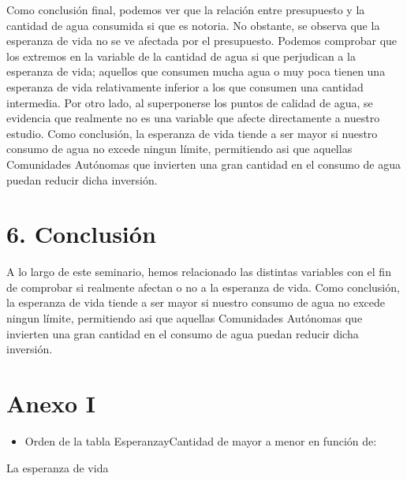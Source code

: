\documentclass[
]{article}
\newenvironment{Shaded}{\begin{snugshade}}{\end{snugshade}}
\newcommand{\FunctionTok}[1]{\textcolor[rgb]{0.13,0.29,0.53}{\textbf{#1}}}
\newcommand{\NormalTok}[1]{#1}
\newcommand{\OtherTok}[1]{\textcolor[rgb]{0.56,0.35,0.01}{#1}}
\newcommand{\SpecialCharTok}[1]{\textcolor[rgb]{0.81,0.36,0.00}{\textbf{#1}}}
\providecommand{\tightlist}{%
  \setlength{\itemsep}{0pt}\setlength{\parskip}{0pt}}
\begin{document}
Como conclusión final, podemos ver que la relación entre presupuesto y
la cantidad de agua consumida si que es notoria. No obstante, se observa
que la esperanza de vida no se ve afectada por el presupuesto. Podemos
comprobar que los extremos en la variable de la cantidad de agua si que
perjudican a la esperanza de vida; aquellos que consumen mucha agua o
muy poca tienen una esperanza de vida relativamente inferior a los que
consumen una cantidad intermedia. Por otro lado, al superponerse los
puntos de calidad de agua, se evidencia que realmente no es una variable
que afecte directamente a nuestro estudio. Como conclusión, la esperanza
de vida tiende a ser mayor si nuestro consumo de agua no excede ningun
límite, permitiendo asi que aquellas Comunidades Autónomas que invierten
una gran cantidad en el consumo de agua puedan reducir dicha inversión.

\hypertarget{conclusiuxf3n}{%
\section{6. Conclusión}\label{conclusiuxf3n}}

A lo largo de este seminario, hemos relacionado las distintas variables
con el fin de comprobar si realmente afectan o no a la esperanza de
vida. Como conclusión, la esperanza de vida tiende a ser mayor si
nuestro consumo de agua no excede ningun límite, permitiendo asi que
aquellas Comunidades Autónomas que invierten una gran cantidad en el
consumo de agua puedan reducir dicha inversión.

\hypertarget{anexo}{%
\section{Anexo I}\label{anexo}}

\begin{itemize}
\tightlist
\item
  Orden de la tabla EsperanzayCantidad de mayor a menor en función de:
\end{itemize}

La esperanza de vida

\begin{Shaded}
\end{Shaded}
\end{document}
